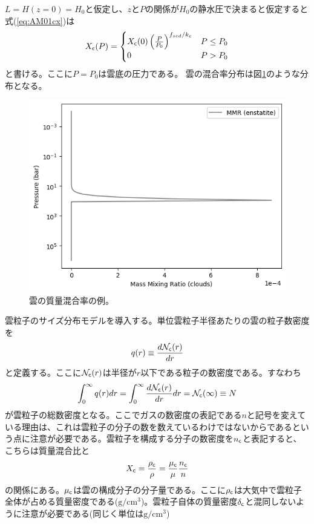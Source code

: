 $L=H(z=0)=H_0$と仮定し、$z$と$P$の関係が$H_0$の静水圧で決まると仮定すると式(\ref{eq:AM01cx})は
\begin{align}
X_{\mathsf{c}}(P) = 
\begin{cases}
X_{\mathsf{c}}(0) \left( \frac{P}{P_0} \right)^{f_{sed}/k_c} & P \le P_0 \\
0 & P > P_0
\end{cases}
\end{align} 
と書ける。ここに$P=P_0$は雲底の圧力である。
雲の混合率分布は図\ref{fig:vmrcloud}のような分布となる。

\begin{figure}[htb]
\begin{center}
\includegraphics[width=\linewidth]{fig/clouds/mmrcloud.png}
\caption{雲の質量混合率の例。\label{fig:vmrcloud}}
\end{center}
\end{figure}

雲粒子のサイズ分布モデルを導入する。単位雲粒子半径あたりの雲の粒子数密度を
\begin{align}
    q(r) \equiv  \frac{d \mathcal{N}_{\mathsf{c}} (r)}{d r} 
\end{align}
と定義する。ここに$\mathcal{N}_{\mathsf{c}}(r)$は半径が$r$以下である粒子の数密度である。すなわち
\begin{align}
    \int_0^\infty q(r) dr = \int_0^\infty \frac{d \mathcal{N}_{\mathsf{c}} (r)}{d r} dr = \mathcal{N}_{\mathsf{c}} (\infty) \equiv N
\end{align}
が雲粒子の総数密度となる。ここでガスの数密度の表記である$n$と記号を変えている理由は、これは雲粒子の分子の数を数えているわけではないからであるという点に注意が必要である。雲粒子を構成する分子の数密度を$n_{\mathsf{c}}$と表記すると、こちらは質量混合比と
\begin{align}
    X_{\mathsf{c}} = \frac{\rho_{\mathsf{c}}}{\rho} = \frac{\mu_{\mathsf{c}}}{\mu} \frac{n_{\mathsf{c}}}{n} 
\end{align}
の関係にある。${\mu_{\mathsf{c}}}$は雲の構成分子の分子量である。ここに$\rho_{\mathsf{c}}$は大気中で雲粒子全体が占める質量密度である($\mathrm{g/cm^3}$)。雲粒子自体の質量密度$\delta_{\mathsf{c}}$と混同しないように注意が必要である(同じく単位は$\mathrm{g/cm^3}$)

